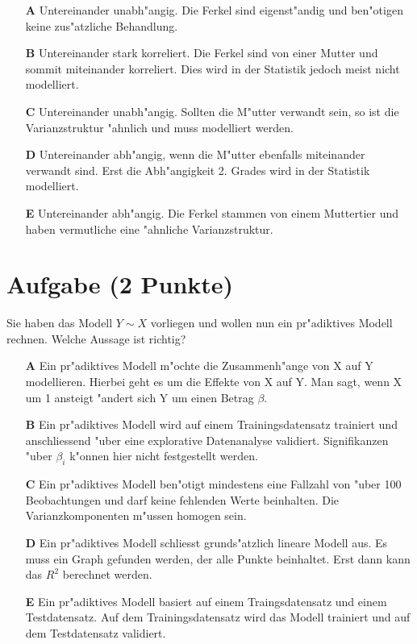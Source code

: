 \documentclass[a4paper, 10pt]{scrartcl}\usepackage[]{graphicx}\usepackage[]{xcolor}
\begin{document}
\begin{enumerate}
\item [\textbf{A} \msquare] Untereinander unabh{"a}ngig. Die Ferkel sind eigenst{"a}ndig und ben{"o}tigen keine zus{"a}tzliche Behandlung.
\item [\textbf{B} \msquare] Untereinander stark korreliert. Die Ferkel sind von einer Mutter und sommit miteinander korreliert. Dies wird in der Statistik jedoch meist nicht modelliert.
\item [\textbf{C} \msquare] Untereinander unabh{"a}ngig. Sollten die M{"u}tter verwandt sein, so ist die Varianzstruktur {"a}hnlich und muss modelliert werden.
\item [\textbf{D} \msquare] Untereinander abh{"a}ngig, wenn die M{"u}tter ebenfalls miteinander verwandt sind. Erst die Abh{"a}ngigkeit 2. Grades wird in der Statistik modelliert.
\item [\textbf{E} \msquare] Untereinander abh{"a}ngig. Die Ferkel stammen von einem Muttertier und haben vermutliche eine {"a}hnliche Varianzstruktur.
\end{enumerate}

\section{Aufgabe \hfill (2 Punkte)}




Sie haben das Modell $Y \sim X$ vorliegen und wollen nun ein
pr{"a}diktives Modell rechnen. Welche Aussage ist richtig?



\begin{enumerate}
\item [\textbf{A} \msquare] Ein pr{"a}diktives Modell m{"o}chte die Zusammenh{"a}nge von X auf Y modellieren. Hierbei geht es um die Effekte von X auf Y. Man sagt, wenn X um 1 ansteigt {"a}ndert sich Y um einen Betrag $\beta$.
\item [\textbf{B} \msquare] Ein pr{"a}diktives Modell wird auf einem Trainingsdatensatz trainiert und anschliessend {"u}ber eine explorative Datenanalyse validiert. Signifikanzen {"u}ber $\beta_i$ k{"o}nnen hier nicht festgestellt werden.
\item [\textbf{C} \msquare] Ein pr{"a}diktives Modell ben{"o}tigt mindestens eine Fallzahl von {"u}ber 100 Beobachtungen und darf keine fehlenden Werte beinhalten. Die Varianzkomponenten m{"u}ssen homogen sein.
\item [\textbf{D} \msquare] Ein pr{"a}diktives Modell schliesst grunds{"a}tzlich lineare Modell aus. Es muss ein Graph gefunden werden, der alle Punkte beinhaltet. Erst dann kann das $R^2$ berechnet werden.
\item [\textbf{E} \msquare] Ein pr{"a}diktives Modell basiert auf einem Traingsdatensatz und einem Testdatensatz. Auf dem Trainingsdatensatz wird das Modell trainiert und auf dem Testdatensatz validiert.
\end{enumerate}
\end{document}
